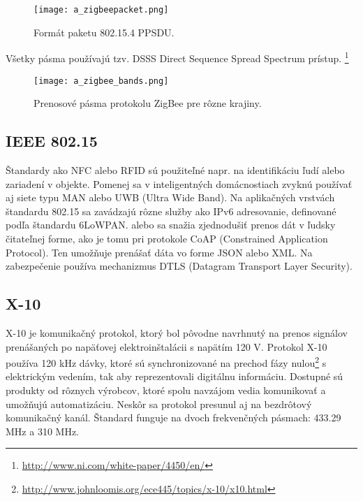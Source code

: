 \documentclass[12pt,a4paper,oneside,openright]{report}
\begin{document}
\begin{figure*}[h]
	\centering
	\texttt{[image: a\_zigbeepacket.png]}
	\caption{Formát paketu 802.15.4 PPSDU. \cite{zigbeepacket}}
	\label{f:o_zigbee_packet}
\end{figure*}

Všetky pásma používajú tzv. DSSS Direct Sequence Spread Spectrum prístup. \footnote{\url{http://www.ni.com/white-paper/4450/en/}}
\begin{figure*}[h]
	\centering
	\texttt{[image: a\_zigbee\_bands.png]}
	\caption{Prenosové pásma protokolu ZigBee pre rôzne krajiny. \cite{zigbeebands}}
	\label{f:o_zigbee_bands}
\end{figure*}


\subsection{IEEE 802.15}
Štandardy ako NFC alebo RFID sú použiteľné napr. na identifikáciu ľudí alebo zariadení v objekte. Pomenej sa v inteligentných domácnostiach zvyknú používať aj siete typu MAN alebo UWB (Ultra Wide Band).
Na aplikačných vrstvách štandardu 802.15 sa zavádzajú rôzne služby ako IPv6 adresovanie, definované podľa štandardu 6LoWPAN. alebo sa snažia zjednodušiť prenos dát v ľudsky čitateľnej forme, ako je tomu pri protokole CoAP (Constrained Application Protocol). Ten umožňuje prenášať dáta vo forme JSON alebo XML. Na zabezpečenie používa mechanizmus DTLS (Datagram Transport Layer Security).

\subsection{X-10}
X-10 je komunikačný protokol, ktorý bol pôvodne navrhnutý na prenos signálov prenášaných po napäťovej elektroinštalácii s napätím 120 V. Protokol X-10 používa 120 kHz dávky, ktoré sú synchronizované na prechod fázy nulou\footnote{\url{http://www.johnloomis.org/ece445/topics/x-10/x10.html}} s elektrickým vedením, tak aby reprezentovali digitálnu informáciu. Dostupné sú produkty od rôznych výrobcov, ktoré spolu navzájom vedia komunikovať a umožňujú automatizáciu.\cite{x10mi}
Neskôr sa protokol presunul aj na bezdrôtový komunikačný kanál. Štandard funguje na dvoch frekvenčných pásmach: 433.29 MHz a 310 MHz. \cite{x10freq}
\end{document}
